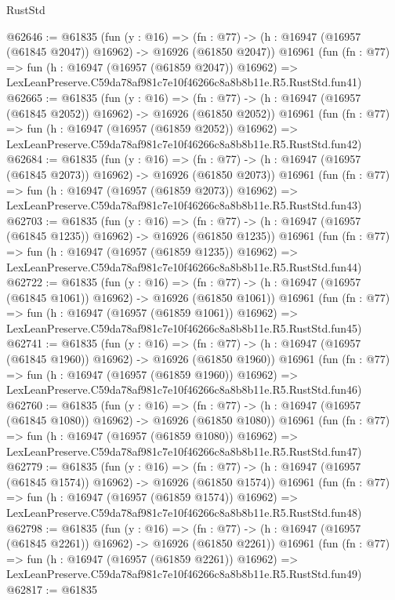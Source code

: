 \begin{lexlean}{RustStd}
\begin{coremodule}
@62646 := @61835
    (fun (y : @16) =>
    (fn : @77) -> (h : @16947 (@16957 (@61845 @2047)) @16962) -> @16926 (@61850 @2047))
    @16961
    (fun (fn : @77) =>
    fun (h : @16947 (@16957 (@61859 @2047)) @16962) =>
    LexLeanPreserve.C59da78af981c7e10f46266c8a8b8b11e.R5.RustStd.fun41)
@62665 := @61835
    (fun (y : @16) =>
    (fn : @77) -> (h : @16947 (@16957 (@61845 @2052)) @16962) -> @16926 (@61850 @2052))
    @16961
    (fun (fn : @77) =>
    fun (h : @16947 (@16957 (@61859 @2052)) @16962) =>
    LexLeanPreserve.C59da78af981c7e10f46266c8a8b8b11e.R5.RustStd.fun42)
@62684 := @61835
    (fun (y : @16) =>
    (fn : @77) -> (h : @16947 (@16957 (@61845 @2073)) @16962) -> @16926 (@61850 @2073))
    @16961
    (fun (fn : @77) =>
    fun (h : @16947 (@16957 (@61859 @2073)) @16962) =>
    LexLeanPreserve.C59da78af981c7e10f46266c8a8b8b11e.R5.RustStd.fun43)
@62703 := @61835
    (fun (y : @16) =>
    (fn : @77) -> (h : @16947 (@16957 (@61845 @1235)) @16962) -> @16926 (@61850 @1235))
    @16961
    (fun (fn : @77) =>
    fun (h : @16947 (@16957 (@61859 @1235)) @16962) =>
    LexLeanPreserve.C59da78af981c7e10f46266c8a8b8b11e.R5.RustStd.fun44)
@62722 := @61835
    (fun (y : @16) =>
    (fn : @77) -> (h : @16947 (@16957 (@61845 @1061)) @16962) -> @16926 (@61850 @1061))
    @16961
    (fun (fn : @77) =>
    fun (h : @16947 (@16957 (@61859 @1061)) @16962) =>
    LexLeanPreserve.C59da78af981c7e10f46266c8a8b8b11e.R5.RustStd.fun45)
@62741 := @61835
    (fun (y : @16) =>
    (fn : @77) -> (h : @16947 (@16957 (@61845 @1960)) @16962) -> @16926 (@61850 @1960))
    @16961
    (fun (fn : @77) =>
    fun (h : @16947 (@16957 (@61859 @1960)) @16962) =>
    LexLeanPreserve.C59da78af981c7e10f46266c8a8b8b11e.R5.RustStd.fun46)
@62760 := @61835
    (fun (y : @16) =>
    (fn : @77) -> (h : @16947 (@16957 (@61845 @1080)) @16962) -> @16926 (@61850 @1080))
    @16961
    (fun (fn : @77) =>
    fun (h : @16947 (@16957 (@61859 @1080)) @16962) =>
    LexLeanPreserve.C59da78af981c7e10f46266c8a8b8b11e.R5.RustStd.fun47)
@62779 := @61835
    (fun (y : @16) =>
    (fn : @77) -> (h : @16947 (@16957 (@61845 @1574)) @16962) -> @16926 (@61850 @1574))
    @16961
    (fun (fn : @77) =>
    fun (h : @16947 (@16957 (@61859 @1574)) @16962) =>
    LexLeanPreserve.C59da78af981c7e10f46266c8a8b8b11e.R5.RustStd.fun48)
@62798 := @61835
    (fun (y : @16) =>
    (fn : @77) -> (h : @16947 (@16957 (@61845 @2261)) @16962) -> @16926 (@61850 @2261))
    @16961
    (fun (fn : @77) =>
    fun (h : @16947 (@16957 (@61859 @2261)) @16962) =>
    LexLeanPreserve.C59da78af981c7e10f46266c8a8b8b11e.R5.RustStd.fun49)
@62817 := @61835

\end{coremodule}
\end{lexlean}
